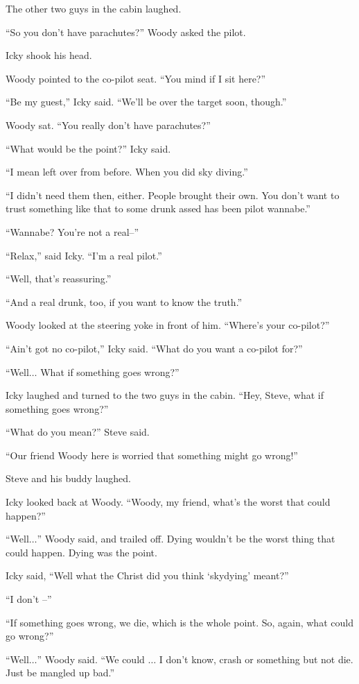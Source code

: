 The other two guys in the cabin laughed.

``So you don't have parachutes?'' Woody asked the pilot.

Icky shook his head.

Woody pointed to the co-pilot seat. ``You mind if I sit here?''

``Be my guest,'' Icky said. ``We'll be over the target soon, though.''

Woody sat. ``You really don't have parachutes?''

``What would be the point?'' Icky said.

``I mean left over from before. When you did sky diving.''

``I didn't need them then, either. People brought their own. You don't want to trust something like that to some drunk assed has been pilot wannabe.''

``Wannabe? You're not a real–''

``Relax,'' said Icky. ``I'm a real pilot.''

``Well, that's reassuring.''

``And a real drunk, too, if you want to know the truth.''

Woody looked at the steering yoke in front of him. ``Where's your co-pilot?''

``Ain't got no co-pilot,'' Icky said. ``What do you want a co-pilot for?''

``Well$\ldots$ What if something goes wrong?''

Icky laughed and turned to the two guys in the cabin. ``Hey, Steve, what if something goes wrong?''

``What do you mean?'' Steve said.

``Our friend Woody here is worried that something might go wrong!''

Steve and his buddy laughed.

Icky looked back at Woody. ``Woody, my friend, what's the worst that could happen?''

``Well$\ldots$'' Woody said, and trailed off. Dying wouldn't be the worst thing that could happen. Dying was the point.

Icky said, ``Well what the Christ did you think `skydying' meant?''

``I don't –''

``If something goes wrong, we die, which is the whole point. So, again, what could go wrong?''

``Well$\ldots$'' Woody said. ``We could $\ldots$ I don't know, crash or something but not die. Just be mangled up bad.''

